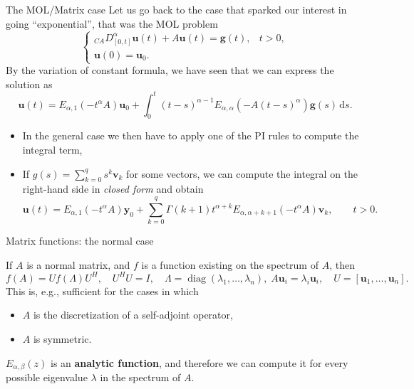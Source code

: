 \documentclass[aspectratio=169,xcolor=dvipsnames]{beamer}
\begin{document}
\begin{frame}{The MOL/Matrix case}
Let us go back to the case that sparked our interest in going ``exponential'', that was the MOL problem
\[
\begin{cases}
{}_{CA}D^\alpha_{[0,t]} \mathbf{u}(t) + A\mathbf{u}(t) = \mathbf{g}(t), & t > 0,\\
\mathbf{u}(0) = \mathbf{u}_0.
\end{cases}
\]
By the variation of constant formula, we have seen that we can express the solution as
\[
\mathbf{u}(t) = E_{\alpha,1}(-t^\alpha A) \mathbf{u}_0 + \int_{0}^{t} (t-s)^{\alpha-1} E_{\alpha,\alpha}(-A(t-s)^\alpha)\mathbf{g}(s)\,\textrm{d}s.
\]
\begin{itemize}
	\item<2-> In the general case we then have to apply one of the PI rules to compute the integral term, 
	\item<3-> If $g(s) = \sum_{k=0}^q s^k \mathbf{v}_k$ for some vectors, we can compute the integral on the right-hand side in \emph{closed form} and obtain
	\[
	\mathbf{u}(t) = E_{\alpha,1}(-t^\alpha A)\mathbf{y}_0 + \sum_{k=0}^{q} \Gamma(k+1) t^{\alpha+k} E_{\alpha,\alpha+k+1}(-t^\alpha A)\mathbf{v}_k, \qquad t > 0.
	\]
\end{itemize}

\end{frame}

\begin{frame}{Matrix functions: the normal case}

If $A$ is a normal matrix, and $f$ is a function existing on the spectrum of $A$, then
\[
f(A) = U f(\Lambda) U^H, \quad U^HU= I, \quad \Lambda = \operatorname{diag}(\lambda_1,\ldots,\lambda_n),\; A \mathbf{u}_i = \lambda_i \mathbf{u}_i, \quad U = [\mathbf{u}_1,\ldots,\mathbf{u}_n].
\]
This is, e.g., sufficient for the cases in which
\begin{itemize}
	\item $A$ is the discretization of a self-adjoint operator,
	\item $A$ is symmetric.
\end{itemize}
$E_{\alpha,\beta}(z)$ is an \textbf{analytic function}, and therefore we can compute it for every possible eigenvalue $\lambda$ in the spectrum of $A$.\vfill


\end{frame}
\end{document}
